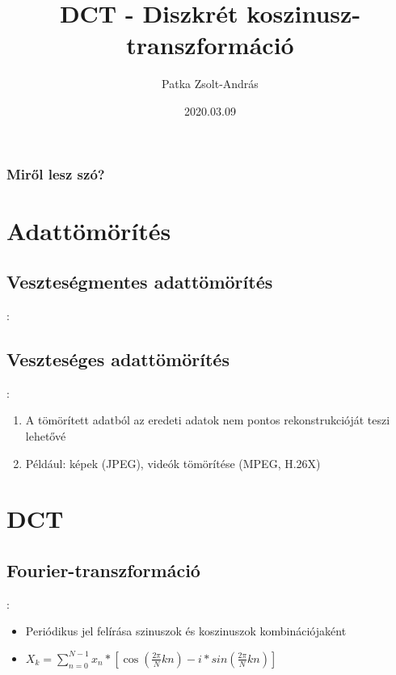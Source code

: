 \documentclass{beamer}
\title{DCT - Diszkrét koszinusz-transzformáció}
\author{Patka Zsolt-András}
\institute{Sapientia EMTE - Számítástechnika IV}
\date{2020.03.09}
\begin{document}
\begin{frame}
    \titlepage
\end{frame}

\begin{frame}
\frametitle{Miről lesz szó?}
\tableofcontents
\end{frame}

\section{Adattömörítés}

\subsection{Veszteségmentes adattömörítés}
\begin{frame}{\secname : \subsecname}
\end{frame}

\subsection{Veszteséges adattömörítés}
\begin{frame}{\secname : \subsecname}
\begin{enumerate}
    \item A tömörített adatból az eredeti adatok nem pontos rekonstrukcióját teszi lehetővé
    \item Például: képek (JPEG), videók tömörítése (MPEG, H.26X)
\end{enumerate}    
\end{frame}

\section{DCT}

\subsection{Fourier-transzformáció}
\begin{frame}{\secname : \subsecname}
    \begin{itemize}
        \item Periódikus jel felírása szinuszok és koszinuszok kombinációjaként
        \item $ X_k = \sum_{n=0}^{N - 1} x_n * [\cos(\frac{2 \pi}{N} kn) - i * sin(\frac{2\pi}{N} kn)]$
    \end{itemize}
\end{frame}
\end{document}
